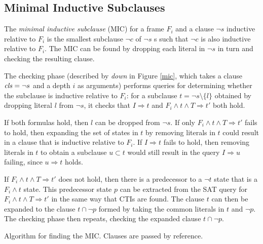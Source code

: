 \documentclass[12pt,a4paper,twoside,openright]{report}
\begin{document}
{{\subsection{Minimal Inductive Subclauses}
The \emph{minimal inductive subclause} (MIC) for a frame $F_i$ and a clause $\neg s$
inductive relative to $F_i$
is the smallest subclause $\neg c$ of $\neg s$ s such that
$\neg c$ is also inductive relative to $F_i$.
The MIC can be found by dropping each literal
in $\neg s$ in turn and checking the resulting clause.

The checking phase (described by {\it down} in Figure \ref{mic},
which takes a clause ${\it cls} = \neg s$ and a depth $i$ as arguments)
performs queries
for determining whether the subclause is inductive relative to
$F_i$: for a subclause $t = \neg s \setminus \{l\}$ obtained by dropping
literal $l$ from $\neg s$, it checks that
$I \Rightarrow t$ and $F_i \wedge t \wedge T \Rightarrow t'$ both hold.

If both formulas hold, then $l$ can be dropped from $\neg s$.
If only $F_i \wedge t \wedge T \Rightarrow t'$ fails to hold, then
expanding the set of states in $t$ by removing %
literals in $t$ could result in a clause that is inductive relative to $F_i$.
If $I \Rightarrow t$ fails to hold, then removing literals in $t$ to
obtain a subclause $u \subset t$ would still result in the query $I \Rightarrow u$
failing, since $u \Rightarrow t$ holds.

If $F_i \wedge t \wedge T \Rightarrow t'$ does not hold, then
there is a predecessor to a $\neg t$ state that is a $F_i \wedge t$ state.
This predecessor state $p$ can be extracted from the SAT query for
$F_i \wedge t \wedge T \Rightarrow t'$ in the same way that CTIs are found.
The clause $t$ can then be expanded to the clause $t \cap \neg p$
formed by taking the common literals in $t$ and $\neg p$.
The checking phase then repeats, checking the expanded clause $t \cap \neg p$.

\begin{algorithm}[t]
\DontPrintSemicolon
{}
\caption{Algorithm for finding the MIC. Clauses are
passed by reference.}
\label{mic}
\end{algorithm}

}}
\end{document}

